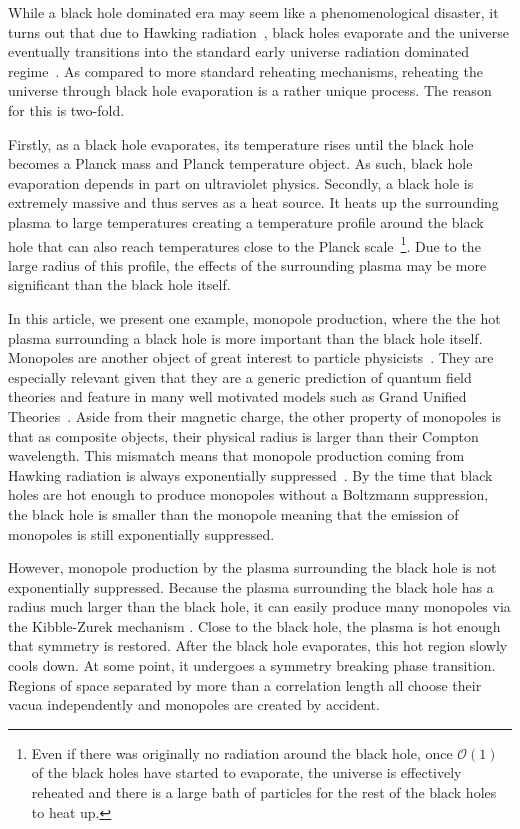 \documentclass[superscriptaddress,groupedaddress,nofootnoteinbib,11pt]{article}
\begin{document}
While a black hole dominated era may seem like a phenomenological disaster, it turns out that due to Hawking radiation~\cite{Hawking:1974rv,Hawking:1975vcx,Page:1976df}, black holes evaporate and the universe eventually transitions into the standard early universe radiation dominated regime~\cite{Green:1999yh,Carr:2009jm,Lennon:2017tqq,Hooper:2019gtx,Hook:2014mla,Baldes:2020nuv,Keith:2020jww}.
As compared to more standard reheating mechanisms, reheating the universe through black hole evaporation is a rather unique process.
The reason for this is two-fold.  

Firstly, as a black hole evaporates, its temperature rises until the black hole becomes a Planck mass and Planck temperature object.  As such, black hole evaporation depends in part on ultraviolet physics.
Secondly, a black hole is extremely massive and thus serves as a heat source.  It heats up the surrounding plasma to large temperatures creating a temperature profile around the black hole that can also reach temperatures close to the Planck scale~\footnote{Even if there was originally no radiation around the black hole, once $\mathcal{O}(1)$ of the black holes have started to evaporate, the universe is effectively reheated and there is a large bath of particles for the rest of the black holes to heat up.}.  Due to the large radius of this profile, the effects of the surrounding plasma may be more significant than the black hole itself.

In this article, we present one example, monopole production, where the the hot plasma surrounding a black hole is more important than the black hole itself.  Monopoles are another object of great interest to particle physicists~\cite{Dirac:1931kp,Guth:1979bh,Preskill:1984gd}.  They are especially relevant given that they are a generic prediction of quantum field theories and feature in many well motivated models such as Grand Unified Theories~\cite{Georgi:1974sy,Georgi:1974yf,tHooft:1974kcl,Polyakov:1974ek}.
Aside from their magnetic charge, the other property of monopoles is that as composite objects, their physical radius is larger than their Compton wavelength.  This mismatch means that monopole production coming from Hawking radiation is always exponentially suppressed~\cite{Johnson:2018gjr}.  By the time that black holes are hot enough to produce monopoles without a Boltzmann suppression, the black hole is smaller than the monopole meaning that the emission of monopoles is still exponentially suppressed.

However, monopole production by the plasma surrounding the black hole is not exponentially suppressed.  Because the plasma surrounding the black hole has a radius much larger than the black hole, it can easily produce many monopoles via the Kibble-Zurek mechanism \cite{Kibble:1976sj,Zurek:1985qw,Murayama:2009nj}.  Close to the black hole, the plasma is hot enough that symmetry is restored.  After the black hole evaporates, this hot region slowly cools down.  At some point, it undergoes a symmetry breaking phase transition.  Regions of space separated by more than a correlation length all choose their vacua independently and monopoles are created by accident.
\end{document}
